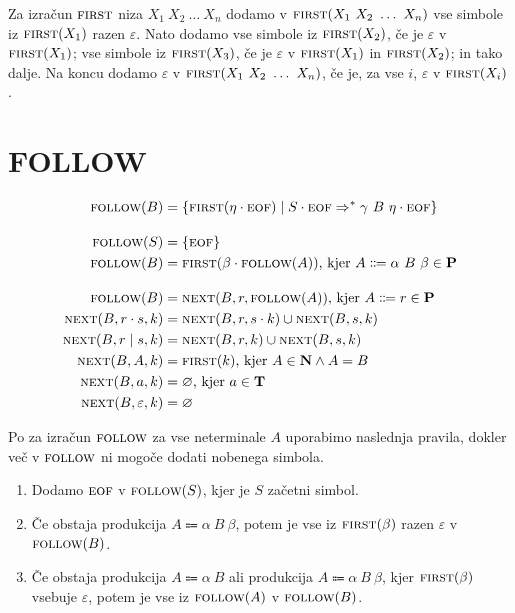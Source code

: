 \documentclass{report}
\newcommand{\Empty}{\varnothing}
\newcommand{\Null}{\varepsilon}
\newcommand{\Seq}{\cdot}
\newcommand{\Spc}{\ }
\newcommand{\Union}{\mathrel{|}}
\newcommand{\Set}[1]{\mathbf{#1}}
\newcommand{\FIRST}{\textsc{first}}
\newcommand{\FOLLOW}{\textsc{follow}}
\newcommand{\NEXT}{\textsc{next}}
\newcommand{\EOF}{\textsc{eof}}
\newcommand{\Terminals}{\Set{T}}
\newcommand{\Productions}{\Set{P}}
\newcommand{\NonTerminals}{\Set{N}}
\newcommand{\Arrow}{\Coloneq}
\newcommand{\DeriveStar}{\Rightarrow^\ast}
\newcommand{\NT}[1]{{#1}}
\newcommand{\T}[1]{{#1}}
\newcommand{\Sym}[1]{{#1}}
\begin{document}
Za izračun $\FIRST$ niza $\Sym{X}_1 \Spc \Sym{X}_2 \Spc \dots \Spc \Sym{X}_n$ dodamo v $\FIRST(\Sym{X}_1 \Spc \Sym{X}_2 \Spc \dots \Spc \Sym{X}_n)$ vse simbole iz $\FIRST(\Sym{X}_1)$ razen $\Null$. Nato dodamo vse simbole iz $\FIRST(\Sym{X}_2)$, če je $\Null$ v $\FIRST(\Sym{X}_1)$; vse simbole iz $\FIRST(\Sym{X}_3)$, če je $\Null$ v $\FIRST(\Sym{X}_1)$ in $\FIRST(\Sym{X}_2)$; in tako dalje.
Na koncu dodamo $\Null$ v $\FIRST(\Sym{X}_1 \Spc \Sym{X}_2 \Spc \dots \Spc \Sym{X}_n)$, če je, za vse $i$, $\Null$ v $\FIRST(\Sym{X}_i)$.

\section{FOLLOW}
\begin{tcolorbox}[title={Definicija}]
  \begin{equation*}
    \begin{aligned}
      \FOLLOW(\NT{B}) &= \{ \FIRST(\eta \Seq \EOF) \mid \NT{S} \Seq \EOF \DeriveStar \gamma \Spc \NT{B} \Spc \eta \Seq \EOF \}\\[1em]
      \FOLLOW(\NT{S}) &= \{\EOF\}\\
      \FOLLOW(\NT{B}) &= \FIRST(\beta \Seq \FOLLOW(\NT{A}))\text{, kjer } \NT{A} \Arrow \alpha \Spc \NT{B} \Spc \beta \in \Productions\\[1em]
      \FOLLOW(\NT{B}) &= \NEXT(\NT{B}, r, \FOLLOW(\NT{A}))\text{, kjer } \NT{A} \Arrow r \in \Productions\\
      \NEXT(\NT{B}, r \Seq s, k) &= \NEXT(\NT{B}, r, s \Seq k) \cup \NEXT(\NT{B}, s, k)\\
      \NEXT(\NT{B}, r \Union s, k) &= \NEXT(\NT{B}, r, k) \cup \NEXT(\NT{B}, s, k)\\
      \NEXT(\NT{B}, \NT{A}, k) &= \FIRST(k) \text{, kjer } \NT{A} \in \NonTerminals \land \NT{A} = \NT{B} \\
      \NEXT(\NT{B}, \T{a}, k) &= \Empty\text{, kjer } \T{a} \in \Terminals\\
      \NEXT(\NT{B}, \Null, k) &= \Empty
    \end{aligned}
  \end{equation*}
\end{tcolorbox}

Po \cite{dragonbook} za izračun $\FOLLOW$ za vse neterminale $\NT{A}$ uporabimo naslednja pravila, dokler več v $\FOLLOW$ ni mogoče dodati nobenega simbola.
\begin{enumerate}
  \item Dodamo $\EOF$ v $\FOLLOW(\NT{S})$, kjer je $\NT{S}$ začetni simbol.
  \item Če obstaja produkcija $\NT{A} \Arrow \alpha \Spc \NT{B} \Spc \beta$, potem je vse iz $\FIRST(\beta)$ razen $\Null$ v $\FOLLOW(\NT{B})$.
  \item Če obstaja produkcija $\NT{A} \Arrow \alpha \Spc \NT{B}$ ali produkcija $\NT{A} \Arrow \alpha \Spc \NT{B} \Spc \beta$, kjer $\FIRST(\beta)$ vsebuje $\Null$, potem je vse iz $\FOLLOW(\NT{A})$ v $\FOLLOW(\NT{B})$.
\end{enumerate}
\end{document}
